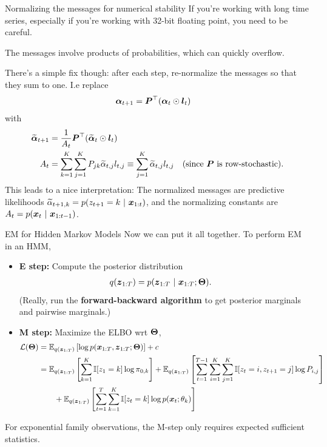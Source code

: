\documentclass[aspectratio=169]{beamer}
\begin{document}

\begin{frame}{Normalizing the messages for numerical stability}
    If you're working with long time series, especially if you're working with 32-bit floating point, you need to be careful. 
    
    The messages involve products of probabilities, which can quickly overflow. 
    
    There's a simple fix though: after each step, re-normalize the messages so that they sum to one. I.e replace
    \begin{align}
        \boldsymbol{\alpha}_{t+1} &= \boldsymbol{P}^\top (\boldsymbol{\alpha}_t \odot \boldsymbol{l}_t)
    \end{align}
    with 
    \begin{align}
        \widetilde{\boldsymbol{\alpha}}_{t+1} &= \frac{1}{A_t} \boldsymbol{P}^\top (\widetilde{\boldsymbol{\alpha}}_t \odot \boldsymbol{l}_t) \\
        A_t &= \sum_{k=1}^K \sum_{j=1}^K P_{jk} \widetilde{\alpha}_{t,j} l_{t,j}
            \equiv \sum_{j=1}^K \widetilde{\alpha}_{t,j} l_{t,j} \quad \text{(since $\boldsymbol{P}$ is row-stochastic)}.
    \end{align}
    This leads to a nice interpretation: The normalized messages are predictive likelihoods $\widetilde{\alpha}_{t+1,k} = p(z_{t+1}=k ~\vert~ \boldsymbol{x}_{1:t})$, and the normalizing constants are $A_t = p(\boldsymbol{x}_t ~\vert~ \boldsymbol{x}_{1:t-1})$.
\end{frame}

\begin{frame}{EM for Hidden Markov Models}
Now we can put it all together. To perform EM in an HMM,
\begin{itemize}
    \item \textbf{E step: } Compute the posterior distribution 
    \begin{align}
        q(\boldsymbol{z}_{1:T}) 
        &= p(\boldsymbol{z}_{1:T} ~\vert~ \boldsymbol{x}_{1:T}; \boldsymbol{\Theta}).
    \end{align}
    (Really, run the \textbf{forward-backward algorithm} to get posterior marginals and pairwise marginals.)
    
    \item \textbf{M step: } Maximize the ELBO wrt $\boldsymbol{\Theta}$,
    \begin{align}
        \mathcal{L}(\boldsymbol{\Theta}) 
        &= \mathbb{E}_{q(\boldsymbol{z}_{1:T})}\left[\log p(\boldsymbol{x}_{1:T}, \boldsymbol{z}_{1:T}; \boldsymbol{\Theta}) \right]  + c \\
        &= \nonumber \mathbb{E}_{q(\boldsymbol{z}_{1:T})}\left[\sum_{k=1}^K \mathbb{I}[z_1=k]\log \pi_{0,k} \right] + 
        \mathbb{E}_{q(\boldsymbol{z}_{1:T})}\left[\sum_{t=1}^{T-1} \sum_{i=1}^K \sum_{j=1}^K \mathbb{I}[z_t=i, z_{t+1}=j]\log P_{i,j} \right] \\
        &\qquad + \mathbb{E}_{q(\boldsymbol{z}_{1:T})}\left[\sum_{t=1}^T \sum_{k=1}^K \mathbb{I}[z_t=k]\log p(\boldsymbol{x}_t; \theta_k) \right] 
    \end{align}
\end{itemize}
For exponential family observations, the M-step only requires expected sufficient statistics.
\end{frame}
\end{document}
